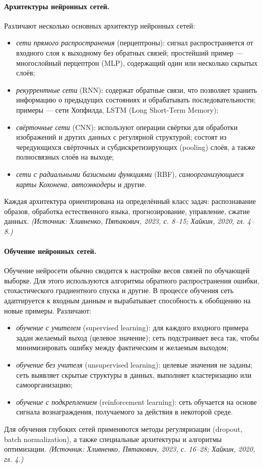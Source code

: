 \documentclass[a4paper,12pt]{article}
\begin{document}
\paragraph{Архитектуры нейронных сетей.}
Различают несколько основных архитектур нейронных сетей:
\begin{itemize}
\item \emph{сети прямого распространения} (перцептроны): сигнал распространяется от входного слоя к выходному без обратных связей; простейший пример — многослойный перцептрон (MLP), содержащий один или несколько скрытых слоёв;
\item \emph{рекуррентные сети} (RNN): содержат обратные связи, что позволяет хранить информацию о предыдущих состояниях и обрабатывать последовательности; примеры — сети Хопфилда, LSTM (Long Short-Term Memory);
\item \emph{свёрточные сети} (CNN): используют операции свёртки для обработки изображений и других данных с регулярной структурой; состоят из чередующихся свёрточных и субдискретизирующих (pooling) слоёв, а также полносвязных слоёв на выходе;
\item \emph{сети с радиальными базисными функциями} (RBF), \emph{самоорганизующиеся карты Кохонена}, \emph{автоэнкодеры} и другие.
\end{itemize}
Каждая архитектура ориентирована на определённый класс задач: распознавание образов, обработка естественного языка, прогнозирование, управление, сжатие данных.
\textit{(Источник: Хливненко, Пятакович, 2023, с. 8--15; Хайкин, 2020, гл. 4--8.)}

\paragraph{Обучение нейронных сетей.}
Обучение нейросети обычно сводится к настройке весов связей по обучающей выборке. Для этого используются алгоритмы обратного распространения ошибки, стохастического градиентного спуска и другие. В процессе обучения сеть адаптируется к входным данным и вырабатывает способность к обобщению на новые примеры. Различают:
\begin{itemize}
\item \emph{обучение с учителем} (supervised learning): для каждого входного примера задан желаемый выход (целевое значение); сеть подстраивает веса так, чтобы минимизировать ошибку между фактическим и желаемым выходом;
\item \emph{обучение без учителя} (unsupervised learning): целевые значения не заданы; сеть выявляет скрытые структуры в данных, выполняет кластеризацию или самоорганизацию;
\item \emph{обучение с подкреплением} (reinforcement learning): сеть обучается на основе сигнала вознаграждения, получаемого за действия в некоторой среде.
\end{itemize}
Для обучения глубоких сетей применяются методы регуляризации (dropout, batch normalization), а также специальные архитектуры и алгоритмы оптимизации.
\textit{(Источник: Хливненко, Пятакович, 2023, с. 16--28; Хайкин, 2020, гл. 4.)}
\end{document}
